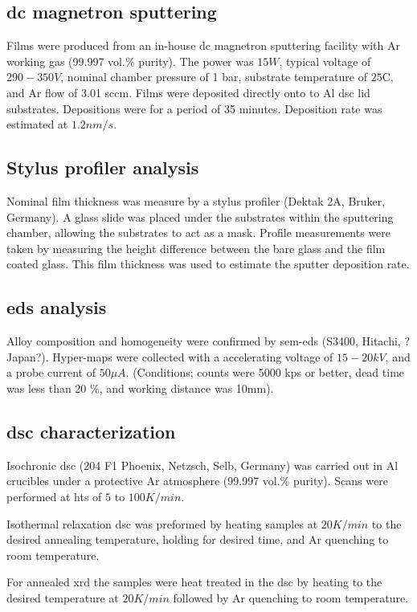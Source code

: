 \documentclass[draft,a4paper,12pt,oneside]{article}%
\begin{document}
\subsection{\acrshort{dc} magnetron sputtering}
Films were produced from an in-house \acrshort{dc} magnetron sputtering facility with Ar working gas (99.997 vol.\% purity). The power was $15W$, typical voltage of $290-350V$, nominal chamber pressure of 1 bar, substrate temperature of $25$\degree C, and Ar flow of 3.01 \acrshort{sccm}. Films were deposited directly onto to Al \acrshort{dsc} lid substrates. Depositions were for a period of 35 minutes. Deposition rate was estimated at $1.2 nm/s$. 

\subsection{Stylus profiler analysis}
Nominal film thickness was measure by a stylus profiler (Dektak 2A, Bruker, Germany). A glass slide was placed under the substrates within the sputtering chamber, allowing the substrates to act as a mask. Profile measurements were taken by measuring the height difference between the bare glass and the film coated glass. This film thickness was used to estimate the sputter deposition rate.  

\subsection{\acrshort{eds} analysis}
Alloy composition and homogeneity were confirmed by \acrshort{sem}-\acrshort{eds} (S3400, Hitachi, ?Japan?). Hyper-maps were collected with a accelerating voltage of $15-20kV$, and a probe current of $50 \mu A$. (Conditions; counts were 5000 kps or better, dead time was less than 20 \%, and working distance was 10mm). 

\subsection{\acrshort{dsc} characterization}
Isochronic \acrshort{dsc} (204 F1 Phoenix, Netzsch, Selb, Germany) was carried out in Al crucibles under a protective Ar atmosphere (99.997 vol.\% purity). Scans were performed at \glspl{ht} of $5$ to $100 K/min$. 

Isothermal relaxation \acrshort{dsc} was preformed by heating samples at $20 K/min$ to the desired annealing temperature, holding for desired time, and Ar quenching to room temperature.

For annealed \acrshort{xrd} the samples were heat treated in the \acrshort{dsc} by heating to the desired temperature at $20 K/min$ followed by Ar quenching to room temperature.
\end{document}
